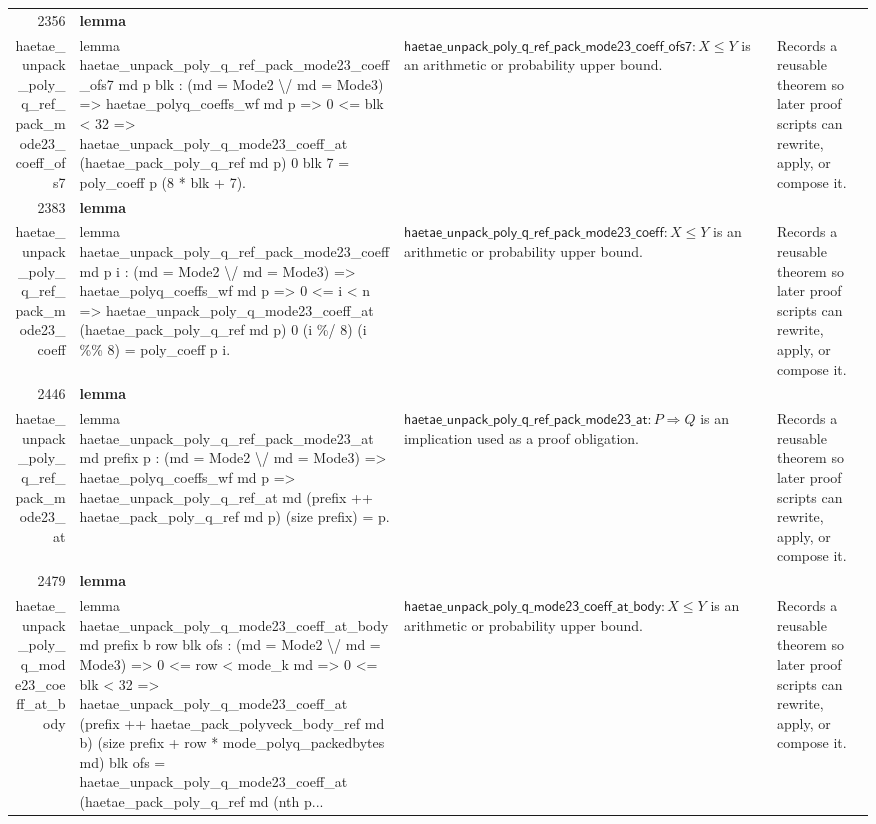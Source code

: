 \documentclass[10pt]{article}
\newcommand{\ec}[1]{\begingroup\ttfamily\scriptsize #1\endgroup}
\begin{document}
\begin{longtable}{r L{0.17\textwidth} L{0.26\textwidth} L{0.27\textwidth} L{0.20\textwidth}}
2356 & \textbf{lemma}\\\ec{haetae\_unpack\_poly\_q\_ref\_pack\_mode23\_coeff\_ofs7} & \ec{lemma haetae\_unpack\_poly\_q\_ref\_pack\_mode23\_coeff\_ofs7 md p blk : (md = Mode2 \textbackslash{}/ md = Mode3) => haetae\_polyq\_coeffs\_wf md p => 0 <= blk < 32 => haetae\_unpack\_poly\_q\_mode23\_coeff\_at (haetae\_pack\_poly\_q\_ref md p) 0 blk 7 = poly\_coeff p (8 * blk + 7).} & \(\mathsf{haetae\_unpack\_poly\_q\_ref\_pack\_mode23\_coeff\_ofs7} : X \le Y\) is an arithmetic or probability upper bound. & Records a reusable theorem so later proof scripts can rewrite, apply, or compose it. \\
2383 & \textbf{lemma}\\\ec{haetae\_unpack\_poly\_q\_ref\_pack\_mode23\_coeff} & \ec{lemma haetae\_unpack\_poly\_q\_ref\_pack\_mode23\_coeff md p i : (md = Mode2 \textbackslash{}/ md = Mode3) => haetae\_polyq\_coeffs\_wf md p => 0 <= i < n => haetae\_unpack\_poly\_q\_mode23\_coeff\_at (haetae\_pack\_poly\_q\_ref md p) 0 (i \%/ 8) (i \%\% 8) = poly\_coeff p i.} & \(\mathsf{haetae\_unpack\_poly\_q\_ref\_pack\_mode23\_coeff} : X \le Y\) is an arithmetic or probability upper bound. & Records a reusable theorem so later proof scripts can rewrite, apply, or compose it. \\
2446 & \textbf{lemma}\\\ec{haetae\_unpack\_poly\_q\_ref\_pack\_mode23\_at} & \ec{lemma haetae\_unpack\_poly\_q\_ref\_pack\_mode23\_at md prefix p : (md = Mode2 \textbackslash{}/ md = Mode3) => haetae\_polyq\_coeffs\_wf md p => haetae\_unpack\_poly\_q\_ref\_at md (prefix ++ haetae\_pack\_poly\_q\_ref md p) (size prefix) = p.} & \(\mathsf{haetae\_unpack\_poly\_q\_ref\_pack\_mode23\_at} : P \Rightarrow Q\) is an implication used as a proof obligation. & Records a reusable theorem so later proof scripts can rewrite, apply, or compose it. \\
2479 & \textbf{lemma}\\\ec{haetae\_unpack\_poly\_q\_mode23\_coeff\_at\_body} & \ec{lemma haetae\_unpack\_poly\_q\_mode23\_coeff\_at\_body md prefix b row blk ofs : (md = Mode2 \textbackslash{}/ md = Mode3) => 0 <= row < mode\_k md => 0 <= blk < 32 => haetae\_unpack\_poly\_q\_mode23\_coeff\_at (prefix ++ haetae\_pack\_polyveck\_body\_ref md b) (size prefix + row * mode\_polyq\_packedbytes md) blk ofs = haetae\_unpack\_poly\_q\_mode23\_coeff\_at (haetae\_pack\_poly\_q\_ref md (nth p...} & \(\mathsf{haetae\_unpack\_poly\_q\_mode23\_coeff\_at\_body} : X \le Y\) is an arithmetic or probability upper bound. & Records a reusable theorem so later proof scripts can rewrite, apply, or compose it. \\

\end{longtable}
\end{document}
